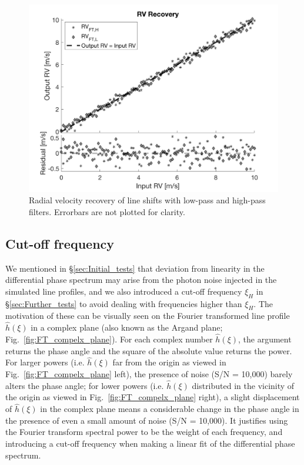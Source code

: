 
\begin{figure}[tbp]
\centering
\includegraphics[width = 0.7 \linewidth]
{./Figures/Methods/5-LINE_SHIFT_ONLY-HL.png}
\caption[Low-pass and high-pass radial velocities]
{Radial velocity recovery of line shifts with low-pass and high-pass filters. Errorbars are not plotted for clarity.}
\label{fig:rv_recovery_LH}
\end{figure} 
\FloatBarrier

\subsection{Cut-off frequency}
\label{sec:noise}

We mentioned in \S\ref{sec:Initial_tests} that deviation from linearity in the differential phase spectrum may arise from the photon noise injected in the simulated line profiles, and we also introduced a cut-off frequency $\xi_{H}$ in \S\ref{sec:Further_tests} to avoid dealing with frequencies higher than $\xi_{H}$. The motivation of these can be visually seen on the Fourier transformed line profile $\hat{h}(\xi)$ in a complex plane (also known as the Argand plane; Fig.~\ref{fig:FT_compelx_plane}). For each complex number $\hat{h}(\xi)$, the argument returns the phase angle and the square of the absolute value returns the power. For larger powers (i.e. $\hat{h}(\xi)$ far from the origin as viewed in Fig.~\ref{fig:FT_compelx_plane} left), the presence of noise (S/N = 10,000) barely alters the phase angle; for lower powers (i.e. $\hat{h}(\xi)$ distributed in the vicinity of the origin as viewed in Fig.~\ref{fig:FT_compelx_plane} right), a slight displacement of $\hat{h}(\xi)$ in the complex plane means a considerable change in the phase angle in the presence of even a small amount of noise (S/N = 10,000). It justifies using the Fourier transform spectral power to be the weight of each frequency, and introducing a cut-off frequency when making a linear fit of the differential phase spectrum. 


